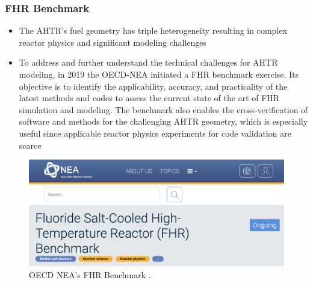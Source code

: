 \begin{frame}
  \frametitle{FHR Benchmark}
  \begin{itemize}
    \item The AHTR's fuel geometry has triple heterogeneity resulting in
    complex reactor physics and significant modeling challenges
    \item To address and further understand the technical challenges for 
    AHTR modeling, in 2019 the OECD-NEA initiated a FHR benchmark exercise. Its objective 
    is to identify the applicability, accuracy, and practicality of the latest 
    methods and codes to assess the current state of the art of FHR simulation 
    and modeling. The benchmark also enables the cross-verification of software 
    and methods for the challenging AHTR geometry, which is especially useful 
    since applicable reactor physics experiments for code validation are scarce
  \end{itemize}
  \begin{figure}[]
    \includegraphics[width=0.5\linewidth]{figures/benchmark.png} 
    \caption{OECD NEA's FHR Benchmark \cite{petrovic_benchmark_2021}.}
\end{figure}
\end{frame}
